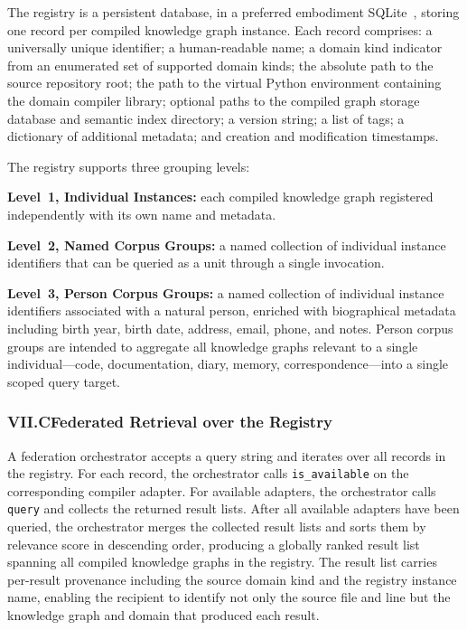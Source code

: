 \documentclass[12pt]{article}
\begin{document}
The registry is a persistent database, in a preferred embodiment
SQLite~\cite{sqlite}, storing one record per compiled knowledge graph instance.
Each record comprises: a universally unique identifier; a human-readable name;
a domain kind indicator from an enumerated set of supported domain kinds; the
absolute path to the source repository root; the path to the virtual Python
environment containing the domain compiler library; optional paths to the
compiled graph storage database and semantic index directory; a version string;
a list of tags; a dictionary of additional metadata; and creation and
modification timestamps.

The registry supports three grouping levels:

\textbf{Level~1, Individual Instances:} each compiled knowledge graph registered
independently with its own name and metadata.

\textbf{Level~2, Named Corpus Groups:} a named collection of individual instance
identifiers that can be queried as a unit through a single invocation.

\textbf{Level~3, Person Corpus Groups:} a named collection of individual instance
identifiers associated with a natural person, enriched with biographical metadata
including birth year, birth date, address, email, phone, and notes. Person corpus
groups are intended to aggregate all knowledge graphs relevant to a single
individual---code, documentation, diary, memory, correspondence---into a single
scoped query target.

\subsubsection{VII.C\quad Federated Retrieval over the Registry}

A federation orchestrator accepts a query string and iterates over all records in
the registry. For each record, the orchestrator calls \texttt{is\_available} on
the corresponding compiler adapter. For available adapters, the orchestrator
calls \texttt{query} and collects the returned result lists. After all available
adapters have been queried, the orchestrator merges the collected result lists and
sorts them by relevance score in descending order, producing a globally ranked
result list spanning all compiled knowledge graphs in the registry. The result
list carries per-result provenance including the source domain kind and the
registry instance name, enabling the recipient to identify not only the source
file and line but the knowledge graph and domain that produced each result.
\end{document}
